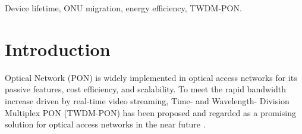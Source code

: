 \documentclass[letter]{IEEEtran}
\begin{document}
\begin{IEEEkeywords}
Device lifetime, ONU migration, energy efficiency, TWDM-PON.
\end{IEEEkeywords}






%
\IEEEpeerreviewmaketitle

\vspace{-3.0mm}

\section{Introduction}
% 
% 
% 
% 
 Optical Network (PON) is widely implemented in optical access networks for its passive features, cost efficiency, and scalability. To meet the rapid bandwidth increase driven by real-time video streaming, Time- and Wavelength- Division Multiplex PON (TWDM-PON) has been proposed and regarded as a promising solution for optical access networks in the near future \cite{6289432}.
\end{document}
